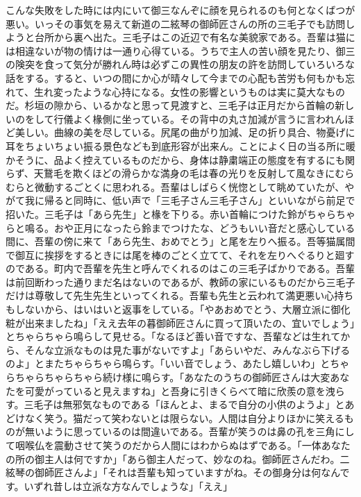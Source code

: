 \documentclass[12pt, openright]{book}
\begin{document}
こんな失敗をした時には内にいて御三なんぞに顔を見られるのも何となくばつが悪い。いっその事気を易えて新道の二絃琴の御師匠さんの所の三毛子でも訪問しようと台所から裏へ出た。三毛子はこの近辺で有名な美貌家である。吾輩は猫には相違ないが物の情けは一通り心得ている。うちで主人の苦い顔を見たり、御三の険突を食って気分が勝れん時は必ずこの異性の朋友の許を訪問していろいろな話をする。すると、いつの間にか心が晴々して今までの心配も苦労も何もかも忘れて、生れ変ったような心持になる。女性の影響というものは実に莫大なものだ。杉垣の隙から、いるかなと思って見渡すと、三毛子は正月だから首輪の新しいのをして行儀よく椽側に坐っている。その背中の丸さ加減が言うに言われんほど美しい。曲線の美を尽している。尻尾の曲がり加減、足の折り具合、物憂げに耳をちょいちょい振る景色なども到底形容が出来ん。ことによく日の当る所に暖かそうに、品よく控えているものだから、身体は静粛端正の態度を有するにも関らず、天鵞毛を欺くほどの滑らかな満身の毛は春の光りを反射して風なきにむらむらと微動するごとくに思われる。吾輩はしばらく恍惚として眺めていたが、やがて我に帰ると同時に、低い声で「三毛子さん三毛子さん」といいながら前足で招いた。三毛子は「あら先生」と椽を下りる。赤い首輪につけた鈴がちゃらちゃらと鳴る。おや正月になったら鈴までつけたな、どうもいい音だと感心している間に、吾輩の傍に来て「あら先生、おめでとう」と尾を左りへ振る。吾等猫属間で御互に挨拶をするときには尾を棒のごとく立てて、それを左りへぐるりと廻すのである。町内で吾輩を先生と呼んでくれるのはこの三毛子ばかりである。吾輩は前回断わった通りまだ名はないのであるが、教師の家にいるものだから三毛子だけは尊敬して先生先生といってくれる。吾輩も先生と云われて満更悪い心持ちもしないから、はいはいと返事をしている。「やあおめでとう、大層立派に御化粧が出来ましたね」「ええ去年の暮御師匠さんに買って頂いたの、宜いでしょう」とちゃらちゃら鳴らして見せる。「なるほど善い音ですな、吾輩などは生れてから、そんな立派なものは見た事がないですよ」「あらいやだ、みんなぶら下げるのよ」とまたちゃらちゃら鳴らす。「いい音でしょう、あたし嬉しいわ」とちゃらちゃらちゃらちゃら続け様に鳴らす。「あなたのうちの御師匠さんは大変あなたを可愛がっていると見えますね」と吾身に引きくらべて暗に欣羨の意を洩らす。三毛子は無邪気なものである「ほんとよ、まるで自分の小供のようよ」とあどけなく笑う。猫だって笑わないとは限らない。人間は自分よりほかに笑えるものが無いように思っているのは間違いである。吾輩が笑うのは鼻の孔を三角にして咽喉仏を震動させて笑うのだから人間にはわからぬはずである。「一体あなたの所の御主人は何ですか」「あら御主人だって、妙なのね。御師匠さんだわ。二絃琴の御師匠さんよ」「それは吾輩も知っていますがね。その御身分は何なんです。いずれ昔しは立派な方なんでしょうな」「ええ」
\end{document}
